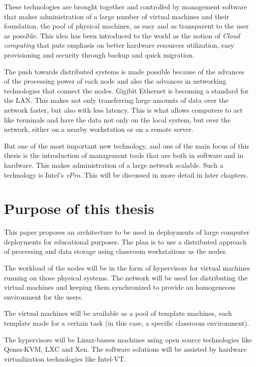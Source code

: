 These technologies are brought together and controlled by management
software that makes administration of a large number of virtual machines
and their foundation, the pool of physical machines, as easy and as
transparent to the user as possible. This idea has been introduced to
the world as the notion of \emph{Cloud computing} that puts emphasis on
better hardware resources utilization, easy provisioning and security
through backup and quick migration.

The push towards distributed systems is made possible because of the
advances of the processing power of each node and also the advances in
networking technologies that connect the nodes. Gigibit Ethernet is
becoming a standard for the \ac{LAN}. This makes not only transferring
large amounts of data over the network faster, but also with less
latency. This is what allows computers to act like terminals and have
the data not only on the local system, but over the network, either on a
nearby workstation or on a remote server.

But one of the most important new technology, and one of the main focus
of this thesis is the introduction of management tools that are both in
software and in hardware. This makes administration of a large network
scalable. Such a technology is Intel's  \emph{vPro}. This will be
discussed in more detail in later chapters.

\section{Purpose of this thesis}

This paper proposes an architecture to be used in deployments of large
computer deployments for educational purposes. The plan is to use a
distributed approach of processing and data storage using classroom
workstations as the nodes.

The workload of the nodes will be in the form of hypervisors for virtual
machines running on those physical systems. The network will be used for
distributing the virtual machines and keeping them synchronized to
provide an homogeneous environment for the users.

The virtual machines will be available as a pool of template machines,
each template made for a certain task (in this case, a specific
classroom environment).

The hypervisors will be Linux-basses machines using open source
technologies like Qemu-KVM, LXC and Xen. The software solutions will be
assisted by hardware virtualization technologies like Intel-VT.

